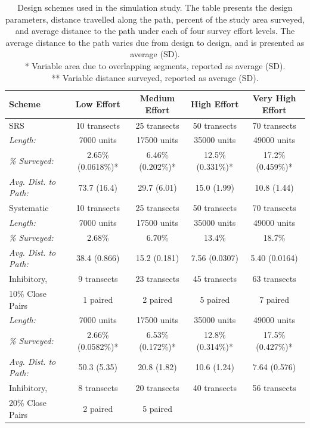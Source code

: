 \documentclass[review]{elsarticle}
\begin{document}
\begin{table}
\caption{Design schemes used in the simulation study. The table presents the
design parameters, distance travelled along the path, percent of the study area
surveyed, and average distance to the path under each of four survey effort
levels. The average distance to the path varies due from design to design, and
is presented as average (SD).\\
* Variable area due to overlapping segments, reported as average (SD).\\
** Variable distance surveyed, reported as average (SD).}
\label{designtable}
\tiny
\begin{tabular}{|l|c|c|c|c|}
\hline
Scheme
&
Low Effort
&
Medium Effort
&
High Effort
&
Very High Effort
\\
\hline
SRS
&
10 transects
&
25 transects
&
50 transects
&
70 transects
\\
\hfill\emph{Length:}
&
7000 units
&
17500 units
&
35000 units
&
49000 units
\\
\hfill\emph{\% Surveyed:}
&
2.65\% (0.0618\%)*
&
6.46\% (0.202\%)*
&
12.5\% (0.331\%)*
&
17.2\% (0.459\%)*
\\
\hfill\emph{Avg. Dist. to Path:}
&
73.7 (16.4)
&
29.7 (6.01)
&
15.0 (1.99)
&
10.8 (1.44)
\\
\hline
Systematic
&
10 transects
&
25 transects
&
50 transects
&
70 transects
\\
\hfill\emph{Length:}
&
7000 units
&
17500 units
&
35000 units
&
49000 units
\\
\hfill\emph{\% Surveyed:}
&
2.68\%
&
6.70\%
&
13.4\%
&
18.7\%
\\
\hfill\emph{Avg. Dist. to Path:}
&
38.4 (0.866)
&
15.2 (0.181)
&
7.56 (0.0307)
&
5.40 (0.0164)
\\
\hline
Inhibitory,
&
9 transects
&
23 transects
&
45 transects
&
63 transects
\\
10\% Close Pairs
&
1 paired
&
2 paired
&
5 paired
&
7 paired
\\
\hfill\emph{Length:}
&
7000 units
&
17500 units
&
35000 units
&
49000 units
\\
\hfill\emph{\% Surveyed:}
&
2.66\% (0.0582\%)*
&
6.53\% (0.172\%)*
&
12.8\% (0.314\%)*
&
17.5\% (0.427\%)*
\\
\hfill\emph{Avg. Dist. to Path:}
&
50.3 (5.35)
&
20.8 (1.82)
&
10.6 (1.24)
&
7.64 (0.576)
\\
\hline
Inhibitory,
&
8 transects
&
20 transects
&
40 transects
&
56 transects
\\
20\% Close Pairs
&
2 paired
&
5 paired

\end{tabular}
\end{table}
\end{document}
